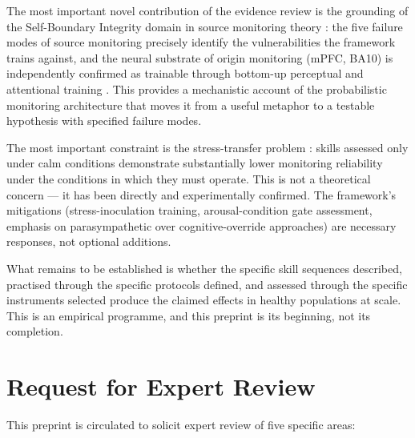 \documentclass[12pt, a4paper]{article}
\begin{document}
The most important novel contribution of the evidence review is the grounding of the
Self-Boundary Integrity domain in source monitoring theory \citep{johnson1993,
mitchell2009, simons2008}: the five failure modes of source monitoring precisely
identify the vulnerabilities the framework trains against, and the neural substrate
of origin monitoring (mPFC, BA10) is independently confirmed as trainable through
bottom-up perceptual and attentional training \citep{subramaniam2012}. This provides
a mechanistic account of the probabilistic monitoring architecture that moves it from a
useful metaphor to a testable hypothesis with specified failure modes.

The most important constraint is the stress-transfer problem \citep{raio2013}: skills
assessed only under calm conditions demonstrate substantially lower monitoring
reliability under the conditions in which they must operate. This is not a theoretical
concern --- it has been directly and experimentally confirmed. The framework's
mitigations (stress-inoculation training, arousal-condition gate assessment,
emphasis on parasympathetic over cognitive-override approaches) are necessary
responses, not optional additions.

What remains to be established is whether the specific skill sequences described,
practised through the specific protocols defined, and assessed through the specific
instruments selected produce the claimed effects in healthy populations at scale.
This is an empirical programme, and this preprint is its beginning, not its
completion.

\section*{Request for Expert Review}

This preprint is circulated to solicit expert review of five specific areas:
\end{document}
